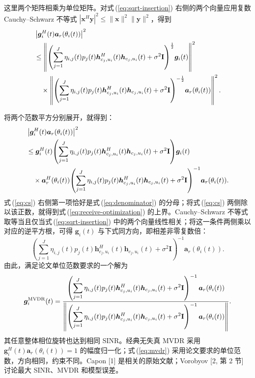 \documentclass[11pt,a4paper]{ctexart}
\begin{document}
\begin{samepage}
这里两个矩阵相乘为单位矩阵。对式\,(\ref{eq:sqrt-insertion}) 右侧的两个向量应用复数 Cauchy--Schwarz 不等式 $|\bm x^H\bm y|^2\le\|\bm x\|^2\|\bm y\|^2$，得到
\begin{align}\label{eq:cs-norms}
&\left|\bm g_i^H(t)\bm a_r(\theta_i(t))\right|^2\notag\\
&\le\left\|\left(\sum_{j=1}^J\eta_{i,j}(t)p_j(t)
\bm h_{c_j,u_i}^{H}(t)\bm h_{c_j,u_i}(t)+\sigma^2\mathbf I\right)^{\frac12}\!\bm g_i(t)\right\|^2\notag\\
&\quad\times\left\|\left(\sum_{j=1}^J\eta_{i,j}(t)p_j(t)
\bm h_{c_j,u_i}^{H}(t)\bm h_{c_j,u_i}(t)+\sigma^2\mathbf I\right)^{-\frac12}\!\bm a_r(\theta_i(t))\right\|^2.
\end{align}
\end{samepage}
将两个范数平方分别展开，就得到：
\begin{align}
&\left|\bm g_i^H(t)\bm a_r(\theta_i(t))\right|^2\notag\\
&\le\bm g_i^H(t)\!\left(\sum_{j=1}^J\eta_{i,j}(t)p_j(t)
\bm h_{c_j,u_i}^{H}(t)\bm h_{c_j,u_i}(t)+\sigma^2\mathbf I\right)\!\bm g_i(t)\notag\\
&\quad\times\bm a_r^H(\theta_i(t))\!\left(\sum_{j=1}^J\eta_{i,j}(t)p_j(t)
\bm h_{c_j,u_i}^{H}(t)\bm h_{c_j,u_i}(t)+\sigma^2\mathbf I\right)^{-1}\!\bm a_r(\theta_i(t)).\label{eq:cs}
\end{align}
式\,(\ref{eq:cs}) 右侧第一项恰好是式\,(\ref{eq:denominator}) 的分母；将式\,(\ref{eq:cs}) 两侧除以该正数，就得到式\,(\ref{eq:receive-optimization}) 的上界。Cauchy--Schwarz 不等式取等当且仅当式\,(\ref{eq:sqrt-insertion}) 中的两个向量线性相关；将这一条件两侧乘以对应的逆平方根，可得 $\bm g_i(t)$ 与下式同方向，即相差非零复数倍：
\begin{equation}\label{eq:direction}
\left(\sum_{j=1}^J\eta_{i,j}(t)p_j(t)
\bm h_{c_j,u_i}^{H}(t)\bm h_{c_j,u_i}(t)+\sigma^2\mathbf I\right)^{-1}
\bm a_r(\theta_i(t)).
\end{equation}
由此，满足论文单位范数要求的一个解为
\begin{equation}\label{eq:mvdr}
\bm g_i^{\rm MVDR}(t)=
\frac{\left(\displaystyle\sum_{j=1}^J\eta_{i,j}(t)p_j(t)
\bm h_{c_j,u_i}^{H}(t)\bm h_{c_j,u_i}(t)+\sigma^2\mathbf I\right)^{-1}
\bm a_r(\theta_i(t))}
{\left\|\left(\displaystyle\sum_{j=1}^J\eta_{i,j}(t)p_j(t)
\bm h_{c_j,u_i}^{H}(t)\bm h_{c_j,u_i}(t)+\sigma^2\mathbf I\right)^{-1}
\bm a_r(\theta_i(t))\right\|}.
\end{equation}
其任意整体相位旋转也达到相同 SINR。经典无失真 MVDR 采用 $\bm g_i^H(t)\bm a_r(\theta_i(t))=1$ 的幅度归一化；式\,(\ref{eq:mvdr}) 采用论文要求的单位范数，方向相同，约束不同。Capon [1] 是相关的原始文献；Vorobyov [2, 第 2 节] 讨论最大 SINR、MVDR 和模型误差。
\end{document}
